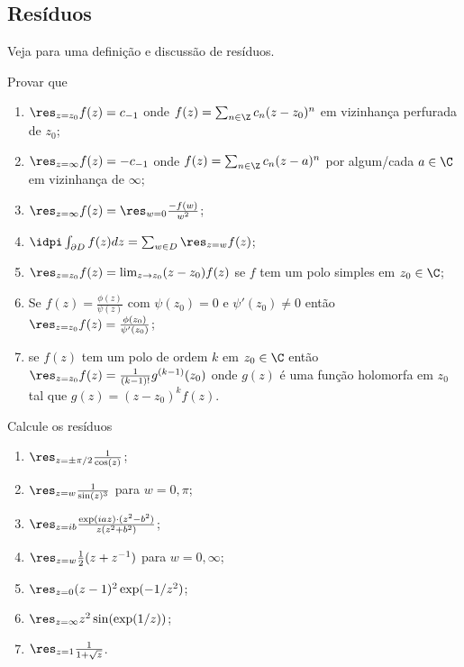 \subsection{Resíduos}

Veja  para uma definição e discussão de resíduos.

\begin{problema}
Provar que
\begin{enumerate}
\item $\res_{z=z_0} f(z) = c_{-1}$ onde $f(z) = \sum_{n\in\Z} c_n (z-z_0)^n$
em vizinhança perfurada de $z_0$;
\item $\res_{z=\infty} f(z) = - c_{-1}$ onde $f(z) = \sum_{n\in\Z} c_n (z-a)^n$
por algum/cada $a\in\C$ em vizinhança de $\infty$;
\item $\res_{z=\infty} f(z) = \res_{w=0} \frac{-f(w)}{w^2}$;
\item $\idpi \int_{\partial D} f(z) dz = \sum_{w\in D} \res_{z=w} f(z)$;
\item $\res_{z=z_0} f(z) = \lim_{z\to z_0} (z-z_0) f(z)$ se $f$ tem um polo simples em $z_0\in\C$;
\item Se $f(z) = \frac{\phi(z)}{\psi(z)}$ com $\psi(z_0)=0$ e $\psi'(z_0)\neq 0$
então $\res_{z=z_0} f(z) = \frac{\phi(z_0)}{\psi'(z_0)}$;
\item se $f(z)$ tem um polo de ordem $k$ em $z_0\in\C$ então
$\res_{z=z_0} f(z) = \frac{1}{(k-1)!} g^{(k-1)}(z_0)$ onde $g(z)$ é uma função holomorfa em $z_0$
tal que $g(z) = (z-z_0)^k f(z)$.
\end{enumerate}
\end{problema}

\begin{problema}
Calcule os resíduos
\begin{enumerate}
\item $\res_{z=\pm \pi/2} \frac{1}{\cos(z)}$;
\item $\res_{z=w} \frac{1}{\sin(z)^3}$ para $w=0,\pi$;
\item $\res_{z=ib} \frac{\exp(iaz) \cdot (z^2-b^2)}{z(z^2+b^2)}$;
\item $\res_{z=w} \frac12 (z+z^{-1})$ para $w=0,\infty$;
\item $\res_{z=0} (z-1)^2 \exp(-1/z^2)$;
\item $\res_{z=\infty} z^2 \sin(\exp(1/z))$;
\item $\res_{z=1} \frac{1}{1+\sqrt{z}}$.
\end{enumerate}
\end{problema}

